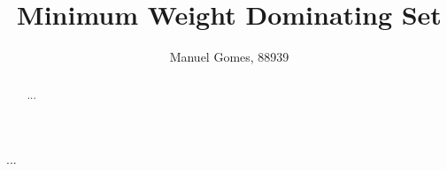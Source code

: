 \documentclass[shortpaper,english,final]{revdetua}
\begin{document}

\title{Minimum Weight Dominating Set}
\author{Manuel Gomes, 88939} %
\maketitle

\begin{abstract}%
  ...
\end{abstract}

\begin{resumo}%
  ...
\end{resumo}











\end{document}
